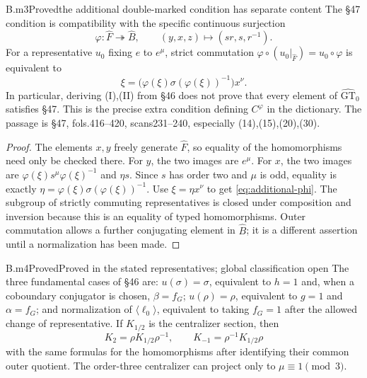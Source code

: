\begin{claim}{B.m3}{Proved}{the additional double-marked condition has separate content}
The \S47 condition is compatibility with the specific continuous surjection
\[
 \varphi:\widehat F\twoheadrightarrow\widehat B,
 \qquad (y,x,z)\longmapsto(sr,s,r^{-1}).
\]
For a representative $u_0$ fixing $e$ to $e^\mu$, strict commutation $\varphi\circ(u_0|_{\widehat F})=u_0\circ\varphi$ is equivalent to
\begin{equation}\label{eq:additional-phi}
 \xi=\bigl(\varphi(\xi)\sigma(\varphi(\xi))^{-1}\bigr)x^\nu.
\end{equation}
In particular, deriving (I),(II) from \S46 does not prove that every element of $\widehat{\mathrm{GT}}_0$ satisfies \S47. This is the precise extra condition defining $C^\varphi$ in the dictionary. The passage is \S47, fols.416--420, scans231--240, especially (14),(15),(20),(30).

\end{claim}
\begin{proof}
The elements $x,y$ freely generate $\widehat F$, so equality of the homomorphisms need only be checked there. For $y$, the two images are $e^\mu$. For $x$, the two images are
$\varphi(\xi)s^\mu\varphi(\xi)^{-1}$ and $\eta s$.
Since $s$ has order two and $\mu$ is odd, equality is exactly
$\eta=\varphi(\xi)\sigma(\varphi(\xi))^{-1}$.
Use $\xi=\eta x^\nu$ to get \eqref{eq:additional-phi}. The subgroup of strictly commuting representatives is closed under composition and inversion because this is an equality of typed homomorphisms. Outer commutation allows a further conjugating element in $\widehat B$; it is a different assertion until a normalization has been made.
\end{proof}

\begin{claim}{B.m4}{Proved}{Proved in the stated representatives; global classification open}
The three fundamental cases of \S46 are: $u(\sigma)=\sigma$, equivalent to $h=1$ and, when a coboundary conjugator is chosen, $\beta=f_G$; $u(\rho)=\rho$, equivalent to $g=1$ and $\alpha=f_G$; and normalization of $\langle\ell_0\rangle$, equivalent to taking $f_G=1$ after the allowed change of representative. If $K_{1/2}$ is the centralizer section, then
\[
 K_2=\rho K_{1/2}\rho^{-1},\qquad
 K_{-1}=\rho^{-1}K_{1/2}\rho
\]
with the same formulas for the homomorphisms after identifying their common outer quotient. The order-three centralizer can project only to $\mu\equiv1\pmod3$.

\end{claim}

